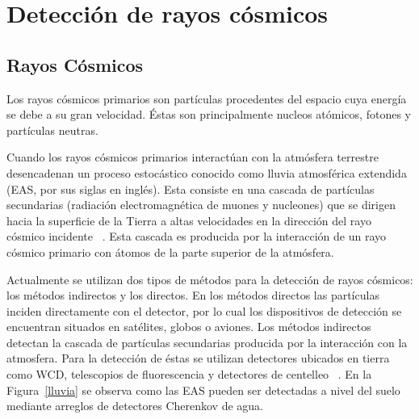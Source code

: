 \chapter{Detección de rayos cósmicos}

\section{Rayos Cósmicos}
Los rayos cósmicos primarios son partículas procedentes del espacio cuya energía se debe a su gran velocidad.
Éstas son principalmente nucleos atómicos, fotones y partículas neutras.

Cuando los rayos cósmicos primarios interactúan con la atmósfera terrestre desencadenan un proceso estocástico conocido como lluvia atmosférica extendida (EAS, por sus siglas en inglés).
Esta consiste en una cascada de partículas secundarias (radiación electromagnética de muones y nucleones) que se dirigen hacia la superficie de la Tierra a altas velocidades en la dirección del rayo cósmico incidente ~\citep{ASOREY2012}.
Esta cascada es producida por la interacción de un rayo cósmico primario con átomos de la parte superior de la atmósfera.


Actualmente se utilizan dos tipos de métodos para la detección de rayos cósmicos: los métodos indirectos y los directos.
En los métodos directos las partículas inciden directamente con el detector, por lo cual los dispositivos de detección se encuentran situados en satélites, globos o aviones.
Los métodos indirectos detectan la cascada de partículas secundarias producida por la interacción con la atmosfera.
Para la detección de éstas se  utilizan detectores ubicados en tierra como WCD, telescopios de fluorescencia y detectores de centelleo ~\citep{schlaepfer2003cosmic}.
En la Figura~\ref{lluvia} se observa como las EAS pueden ser detectadas a nivel del suelo mediante arreglos de detectores Cherenkov de agua.

